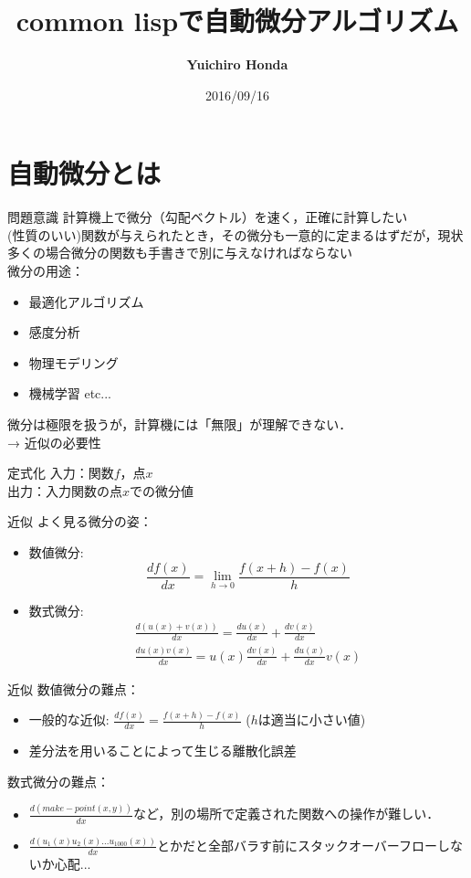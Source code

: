 \documentclass[11pt,xcolor=dvipsnames,table,dvipdfmx]{beamer}
\title{common lispで自動微分アルゴリズム}
\author{\textbf{Yuichiro Honda}}
\date{2016/09/16}
\begin{document}
\maketitle

\section{自動微分とは}
\begin{frame}{問題意識}
 計算機上で微分（勾配ベクトル）を速く，正確に計算したい\\
 (性質のいい)関数が与えられたとき，その微分も一意的に定まるはずだが，現状多くの場合微分の関数も手書きで別に与えなければならない \\
 微分の用途：
 \begin{itemize}
  \item 最適化アルゴリズム
  \item 感度分析
  \item 物理モデリング
  \item 機械学習 etc...
 \end{itemize}
 微分は極限を扱うが，計算機には「無限」が理解できない．\\
 → 近似の必要性
\end{frame}

\begin{frame}{定式化}
 入力：関数$f$，点$x$ \\
 出力：入力関数の点$x$での微分値
\end{frame}

\begin{frame}{近似}
 よく見る微分の姿：
 \begin{itemize}
  \item 数値微分:
	\[
	 \frac{df(x)}{dx} = \lim_{h \to 0} \frac{f(x+h)-f(x)}{h}
	\]
  \item 数式微分:
	\begin{align*}
	 \frac{d(u(x)+v(x))}{dx} = \frac{du(x)}{dx}+\frac{dv(x)}{dx} \\
	 \frac{du(x)v(x)}{dx} = u(x)\frac{dv(x)}{dx} + \frac{du(x)}{dx}v(x)
	\end{align*}
 \end{itemize}
\end{frame}

\begin{frame}{近似}
 数値微分の難点：
 \begin{itemize}
  \item 一般的な近似: $\frac{df(x)}{dx} = \frac{f(x+h)-f(x)}{h}$ ($h$は適当に小さい値)
  \item 差分法を用いることによって生じる離散化誤差
 \end{itemize}
 数式微分の難点：
 \begin{itemize}
  \item $\frac{d(make-point(x, y))}{dx}$など，別の場所で定義された関数への操作が難しい．
  \item $\frac{d(u_1(x)u_2(x)...u_{1000}(x))}{dx}$とかだと全部バラす前にスタックオーバーフローしないか心配...
 \end{itemize}
\end{frame}
\end{document}
